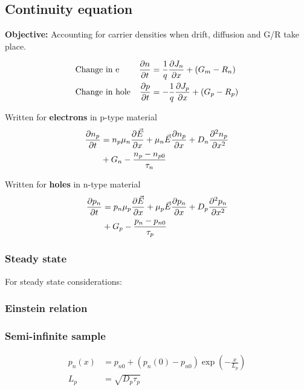 \documentclass[a4paper, fontsize=8pt, landscape, DIV=1]{scrartcl}
\begin{document}
\begin{multicols*}{4}
  \subsection{Continuity equation}
    \textbf{Objective:} Accounting for carrier densities when drift, diffusion and G/R take place.
    
    \begin{align*}
      &\text{Change in e} & \frac{\partial n}{\partial t} &= \frac{1}{q}\frac{\partial J_n}{\partial x}+(G_m-R_n) \\
      &\text{Change in hole} & \frac{\partial p}{\partial t} &= -\frac{1}{q}\frac{\partial J_p}{\partial x}+(G_p-R_p)
    \end{align*}

    Written for \textbf{electrons} in p-type material
    \begin{align*}
      \frac{\partial n_p}{\partial t} &= n_p\mu_n\frac{\partial\vec{E}}{\partial x}+\mu_n\vec{E}\frac{\partial n_p}{\partial x} + D_n\frac{\partial^2n_p}{\partial x^2} \\ &+ G_n - \frac{n_p-n_{p0}}{\tau_n}
    \end{align*}

    Written for \textbf{holes} in n-type material
    \begin{align*}
      \frac{\partial p_n}{\partial t} &= p_n\mu_p\frac{\partial\vec{E}}{\partial x}+\mu_p\vec{E}\frac{\partial p_n}{\partial x} + D_p\frac{\partial^2p_n}{\partial x^2} \\ &+ G_p - \frac{p_n-p_{n0}}{\tau_p}
    \end{align*}

    \subsubsection{Steady state}
    For steady state considerations:

    
    \subsubsection{Einstein relation}
    \begin{center}
       
    \end{center}

    \subsubsection{Semi-infinite sample}
    \begin{align*}
      p_n(x) &= p_{n0} + (p_n(0)-p_{n0}) \exp\left(-\frac{x}{L_p}\right) \\
      L_p &= \sqrt{D_p\tau_p}
    \end{align*}


\end{multicols*}
\end{document}
